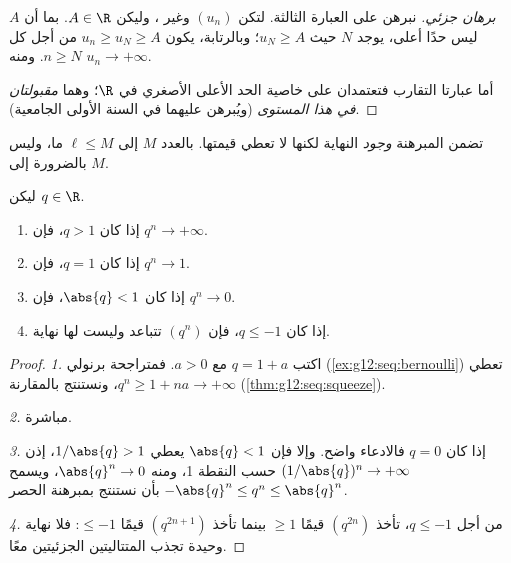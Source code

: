 \begin{proof}[برهان جزئي]
نبرهن على العبارة الثالثة. لتكن $(u_n)$  وغير ، وليكن $A \in \R$. بما أن $A$ ليس حدًا أعلى، يوجد $N$
حيث $u_N \geq A$؛ وبالرتابة، يكون $u_n \geq u_N \geq A$ من أجل كل $n \geq N$.
ومنه $u_n \to +\infty$.

أما عبارتا التقارب فتعتمدان على خاصية الحد الأعلى الأصغري في
$\R$؛ وهما \emph{مقبولتان في هذا المستوى} (ويُبرهن عليهما في السنة الأولى
الجامعية).
\end{proof}

\begin{remark}
تضمن المبرهنة \emph{وجود} النهاية لكنها لا تعطي
قيمتها.    بالعدد $M$  إلى
$\ell \leq M$ ما، وليس بالضرورة إلى $M$.
\end{remark}

\begin{theorem}\label{thm:g12:seq:geometric}
ليكن $q \in \R$.
\begin{enumerate}
  \item إذا كان $q > 1$، فإن $q^n \to +\infty$.
  \item إذا كان $q = 1$، فإن $q^n \to 1$.
  \item إذا كان $\abs{q} < 1$، فإن $q^n \to 0$.
  \item إذا كان $q \leq -1$، فإن $(q^n)$ تتباعد وليست لها نهاية.
\end{enumerate}
\end{theorem}

\begin{proof}
\emph{1.} اكتب $q = 1 + a$ مع $a > 0$. فمتراجحة برنولي
(\cref{ex:g12:seq:bernoulli}) تعطي $q^n \geq 1 + na \to +\infty$، ونستنتج
بالمقارنة (\cref{thm:g12:seq:squeeze}).

\emph{2.} مباشرة.

\emph{3.} إذا كان $q = 0$ فالادعاء واضح. وإلا فإن $\abs{q} < 1$ يعطي
$1/\abs{q} > 1$، إذن $(1/\abs{q})^n \to +\infty$ حسب النقطة 1، ومنه
$\abs{q}^n \to 0$، ويسمح $-\abs{q}^n \leq q^n \leq \abs{q}^n$ بأن
نستنتج بمبرهنة الحصر.

\emph{4.} من أجل $q \leq -1$، تأخذ $(q^{2n})$ قيمًا $\geq 1$ بينما
تأخذ $(q^{2n+1})$ قيمًا $\leq -1$: فلا نهاية وحيدة تجذب
المتتاليتين الجزئيتين معًا.
\end{proof}

